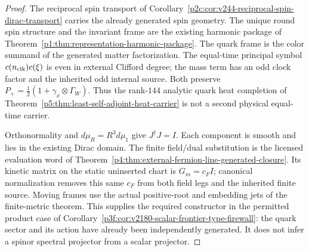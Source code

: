 \documentclass[12pt,a4paper]{article}
\begin{document}
\begin{proof}
The reciprocal spin transport of
Corollary~\ref{p2c:cor:v244-reciprocal-spin-dirac-transport} carries the
already generated spin geometry. The unique round spin structure and the
invariant frame are the existing harmonic package of
Theorem~\ref{p1:thm:representation-harmonic-package}.
The quark frame is the color summand of the generated matter factorization.
The equal-time principal symbol $c(n_{\rm clk})c(\xi)$ is even in external
Clifford degree; the mass term has an odd clock factor and the inherited odd
internal source. Both preserve
$P_+=\tfrac12(1+\gamma_x\otimes\Gamma_W)$.
Thus the rank-$144$ analytic quark heat completion of
Theorem~\ref{p5:thm:least-self-adjoint-heat-carrier} is not a second physical
equal-time carrier.

Orthonormality and $d\mu_R=R^3d\mu_1$ give $J^\dagger J=I$.
Each component is smooth and lies in the existing Dirac domain. The finite
field/dual substitution is the licensed evaluation word of
Theorem~\ref{p4:thm:external-fermion-line-generated-closure}.
Its kinetic matrix on the static uninserted chart is $G_m=c_FI$;
canonical normalization removes this same $c_F$ from both field legs and
the inherited finite source. Moving frames use the actual positive-root
and embedding jets of the finite-metric theorem.
This supplies the required constructor in the permitted product case of
Corollary~\ref{p3f:cor:v2180-scalar-frontier-type-firewall}: the quark
sector and its action have already been independently generated. It does
not infer a spinor spectral projector from a scalar projector.
\end{proof}
\end{document}
